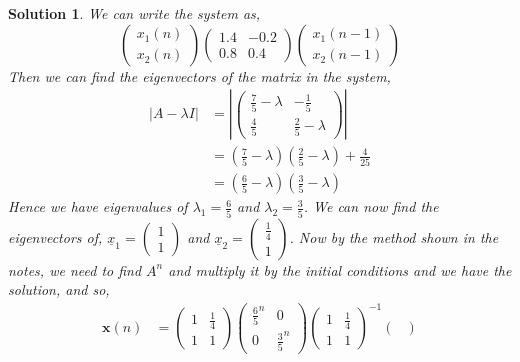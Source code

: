 \documentclass{article}
\renewcommand{\vec}[1]{\boldsymbol{\mathbf{#1}}}
\renewcommand{\l}{\lambda}
\newtheorem{solution}{Solution}
\begin{document}
\begin{solution}
  We can write the system as,
  $$ \begin{pmatrix}
    x_1(n) \\ x_2(n)
  \end{pmatrix} \begin{pmatrix}
    1.4 & -0.2\\ 0.8 & 0.4
  \end{pmatrix} \begin{pmatrix}
    x_1(n-1) \\ x_2(n-1)
  \end{pmatrix}$$
  Then we can find the eigenvectors of the matrix in the system,
  \begin{align*}
    |A - \l I| &= \left|\begin{pmatrix}
      \frac{7}{5} - \l & -\frac{1}{5}\\ \frac{4}{5} & \frac{2}{5} - \l
  \end{pmatrix}\right|\\
  &= \left( \frac{7}{5} - \l \right)\left( \frac{2}{5} - \l \right) + \frac{4}{25}\\
  &= \left( \frac{6}{5} - \l \right)\left( \frac{3}{5} - \l \right)
  \end{align*}
  Hence we have eigenvalues of $\l_1 = \frac{6}{5}$ and $\l_2 = \frac{3}{5}$. We can now find the eigenvectors of, $\displaystyle{\underline{x}_1 = \begin{pmatrix} 1 \\ 1
\end{pmatrix}}$ and $\displaystyle{\underline{x}_2 = \begin{pmatrix}
    \frac{1}{4} \\ 1
  \end{pmatrix}}$. Now by the method shown in the notes, we need to find $A^n$ and multiply it by the initial conditions and we have the solution, and so,
  \begin{align*}
    \vec{x}(n) &= \begin{pmatrix}
      1 & \frac{1}{4} \\ 1 & 1
  \end{pmatrix}\begin{pmatrix}
    \frac{6}{5}^n & 0 \\ 0 & \frac{3}{5}^n
\end{pmatrix}\begin{pmatrix}
  1 & \frac{1}{4} \\ 1 & 1
\end{pmatrix}^{-1} \begin{pmatrix}

\end{pmatrix}
\end{align*}
\end{solution}
\end{document}
